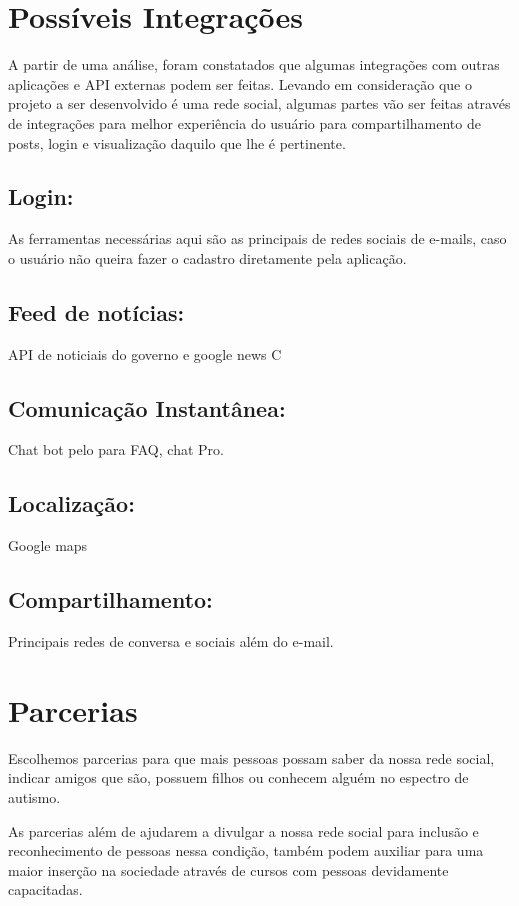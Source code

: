 \begin{apendicesenv}
	
	
	
	
	\section{Possíveis Integrações}
	A partir de uma análise, foram constatados que algumas integrações com outras aplicações e API externas podem ser feitas. Levando em consideração que o projeto a ser desenvolvido é uma rede social, algumas partes vão ser feitas através de integrações para melhor experiência do usuário para compartilhamento de posts, login e visualização daquilo que lhe é pertinente. 
	
	\subsection{Login:}
	As ferramentas necessárias aqui são as principais de redes sociais de e-mails, caso o usuário não queira fazer o cadastro diretamente pela aplicação. 
	\subsection{Feed de notícias:}
	API de noticiais do governo e google news C
	\subsection{Comunicação Instantânea:}
	Chat bot pelo para FAQ, chat Pro. 
	\subsection{Localização:}
	Google maps
	\subsection{Compartilhamento:}
	Principais redes de conversa e sociais além do e-mail. 
	
	\section{Parcerias}
	Escolhemos parcerias para que mais pessoas possam saber da nossa rede social, indicar amigos que são, possuem filhos ou conhecem alguém no espectro de autismo.
	
	As parcerias além de ajudarem a divulgar a nossa rede social para inclusão e reconhecimento de pessoas nessa condição, também podem auxiliar para uma maior inserção na sociedade através de cursos com pessoas devidamente capacitadas.
	

\end{apendicesenv}
